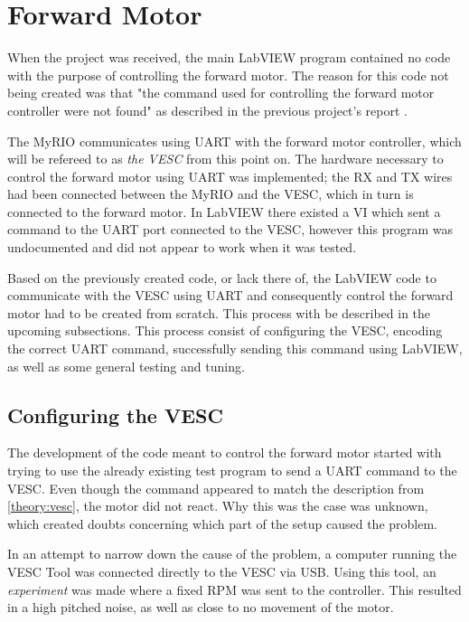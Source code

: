 \section{Forward Motor} \label{method:forward}

When the project was received, the main LabVIEW program contained no code with the purpose of controlling the forward motor. The reason for this code not being created was that "the command used for controlling the forward motor controller were not found" as described in the previous project's report \cite{AronssonKarlsson2022PROJECTAUTOBIKE}.

The MyRIO communicates using UART with the forward motor controller, which will be refereed to as \textit{the VESC} from this point on. The hardware necessary to control the forward motor using UART was implemented; the RX and TX wires had been connected between the MyRIO and the VESC, which in turn is connected to the forward motor. In LabVIEW there existed a VI which sent a command to the UART port connected to the VESC, however this program was undocumented and did not appear to work when it was tested.

Based on the previously created code, or lack there of, the LabVIEW code to communicate with the VESC using UART and consequently control the forward motor had to be created from scratch. This process with be described in the upcoming subsections. This process consist of configuring the VESC, encoding the correct UART command, successfully sending this command using LabVIEW, as well as some general testing and tuning.

\subsection{Configuring the VESC} \label{method:configuringVesc}

The development of the code meant to control the forward motor started with trying to use the already existing test program to send a UART command to the VESC. Even though the command appeared to match the description from \ref{theory:vesc}, the motor did not react. Why this was the case was unknown, which created doubts concerning which part of the setup caused the problem.

In an attempt to narrow down the cause of the problem, a computer running the VESC Tool was connected directly to the VESC via USB. Using this tool, an \textit{experiment} was made where a fixed RPM was sent to the controller. This resulted in a high pitched noise, as well as close to no movement of the motor.

